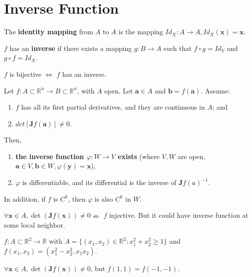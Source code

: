 \section{Inverse Function}

\begin{definition}
    The \textbf{identity mapping} from $A$ to $A$ is the mapping $Id_X: A \to A, Id_X(\mathbf{x}) = \mathbf{x}$.
\end{definition}

\begin{definition}
    $f$ has an \textbf{inverse} if there exists a mapping $g: B \to A$ such that $f \circ g = Id_Y$ and $g \circ f = Id_X$.
\end{definition}

\begin{proposition}
    $f$ is bijective $\iff$ $f$ has an inverse.
\end{proposition}

\begin{theorem}
    Let $f: A \subset \mathbb{R}^{n} \to B \subset \mathbb{R}^{n}$, with $A$ open. Let $\mathbf{a} \in A$ and $\mathbf{b} = f(\mathbf{a})$. Assume:
    \begin{enumerate}
        \item $f$ has all its first partial derivatives, and they are continuous in $A$; and
        \item $det[\mathbf{J}f(\mathbf{a})] \neq 0$.
    \end{enumerate}
    Then, \begin{enumerate}
        \item \textbf{the inverse function $\varphi: W \to V$ exists} (where $V, W$ are open, $\mathbf{a} \in V, \mathbf{b} \in W, \varphi (\mathbf{y}) = \mathbf{x}$),
        \item $\varphi$ is differentiable, and its differential is the inverse of $\mathbf{J}f(a)^{-1}$.
    \end{enumerate}
    In addition, if $f$ is $C ^{k}$, then $\varphi$ is also $C ^{k}$ in $W$.
\end{theorem}

\begin{remark*}
    $\forall \mathbf{x} \in A, \det (\mathbf{J}f(\mathbf{x})) \neq 0 \nRightarrow$ $f$ injective. But it could have inverse function at some local neighbor.

    \begin{example*}
        $f: A \subset \mathbb{R}^{2} \to \mathbb{R}$ with $A = \{(x_1,x_2)\in \mathbb{R}^{2}: x_1 ^{2} + x_2 ^{2} \geq 1\}$ and $f(x_1,x_2) = (x_1 ^{2} - x_2 ^{2}, x_1x_2)$.

        $\forall \mathbf{x} \in A, \det (\mathbf{J}f(\mathbf{x})) \neq 0$, but $f(1,1) = f(-1,-1)$.
    \end{example*}
\end{remark*}



